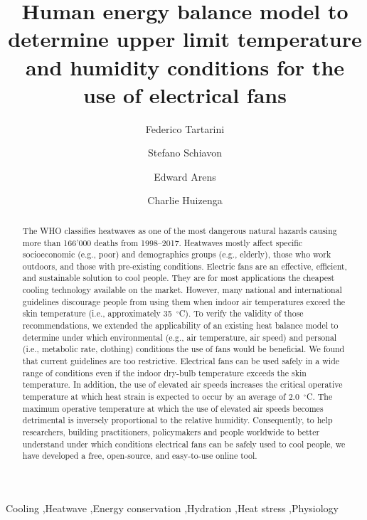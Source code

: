 
\begin{frontmatter}

\title{Human energy balance model to determine upper limit temperature and humidity conditions for the use of electrical fans}

\author[sinBerBest]{Federico Tartarini}
\author[CBE]{Stefano Schiavon}
\author[CBE]{Edward Arens}
\author[CBE]{Charlie Huizenga}

\address[sinBerBest]{SinBerBEST, Berkeley Education Alliance for Research in Singapore, Singapore}
\address[CBE]{Center for the Built Environment, University of California, Berkeley, USA}

\begin{abstract}
    The WHO classifies heatwaves as one of the most dangerous natural hazards causing more than 166'000 deaths from 1998--2017.
    Heatwaves mostly affect specific socioeconomic (e.g., poor) and demographics groups (e.g., elderly), those who work outdoors, and those with pre-existing conditions.
    Electric fans are an effective, efficient, and sustainable solution to cool people.
    They are for most applications the cheapest cooling technology available on the market.
    However, many national and international guidelines discourage people from using them when indoor air temperatures exceed the skin temperature (i.e., approximately 35~$^{\circ}$C\@).
    To verify the validity of those recommendations, we extended the applicability of an existing heat balance model to determine under which environmental (e.g., air temperature, air speed) and personal (i.e., metabolic rate, clothing) conditions the use of fans would be beneficial.
    We found that current guidelines are too restrictive.
    Electrical fans can be used safely in a wide range of conditions even if the indoor dry-bulb temperature exceeds the skin temperature.
    In addition, the use of elevated air speeds increases the critical operative temperature at which heat strain is expected to occur by an average of 2.0~$^{\circ}$C\@.
    The maximum operative temperature at which the use of elevated air speeds becomes detrimental is inversely proportional to the relative humidity.
    Consequently, to help researchers, building practitioners, policymakers and people worldwide to better understand under which conditions electrical fans can be safely used to cool people, we have developed a free, open-source, and easy-to-use online tool.
\end{abstract}

\begin{keyword}
Cooling \sep Heatwave \sep Energy conservation \sep Hydration \sep Heat stress \sep Physiology
\end{keyword}

\end{frontmatter}
